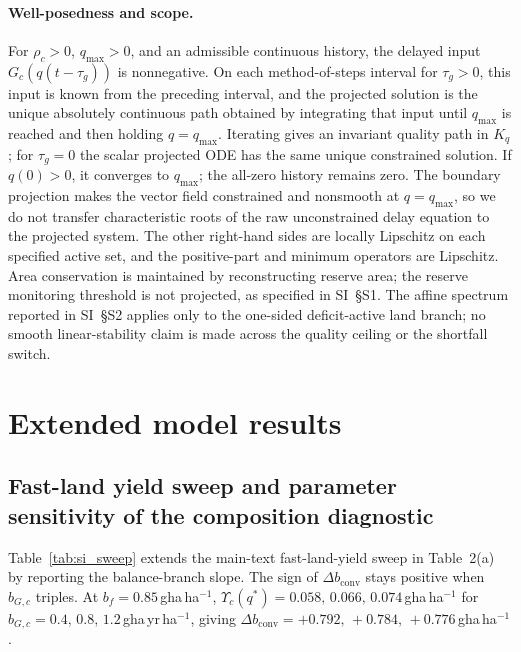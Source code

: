 \documentclass[11pt,a4paper]{article}
\newcommand{\dconv}{\Delta b_{\mathrm{conv}}}
\newcommand{\Ups}{\Upsilon_c}
\begin{document}
\paragraph{Well-posedness and scope.} For $\rho_c>0$, $q_{\max}>0$, and an admissible continuous history, the delayed input $G_c(q(t-\tau_g))$ is nonnegative. On each method-of-steps interval for $\tau_g>0$, this input is known from the preceding interval, and the projected solution is the unique absolutely continuous path obtained by integrating that input until $q_{\max}$ is reached and then holding $q=q_{\max}$. Iterating gives an invariant quality path in $K_q$; for $\tau_g=0$ the scalar projected ODE has the same unique constrained solution. If $q(0)>0$, it converges to $q_{\max}$; the all-zero history remains zero. The boundary projection makes the vector field constrained and nonsmooth at $q=q_{\max}$, so we do not transfer characteristic roots of the raw unconstrained delay equation to the projected system. The other right-hand sides are locally Lipschitz on each specified active set, and the positive-part and minimum operators are Lipschitz. Area conservation is maintained by reconstructing reserve area; the reserve monitoring threshold is not projected, as specified in SI~\S S1. The affine spectrum reported in SI~\S S2 applies only to the one-sided deficit-active land branch; no smooth linear-stability claim is made across the quality ceiling or the shortfall switch.

\section{Extended model results}\label{si:results}

\subsection{Fast-land yield sweep and parameter sensitivity of the composition diagnostic}\label{si:sweep}

Table~\ref{tab:si_sweep} extends the main-text fast-land-yield sweep in Table~2(a) by reporting the balance-branch slope. The sign of $\dconv$ stays positive when $b_{G,c}$ triples. At $b_f=0.85$\,gha\,ha$^{-1}$, $\Ups(q^*)=0.058,\,0.066,\,0.074$\,gha\,ha$^{-1}$ for $b_{G,c}=0.4,\,0.8,\,1.2$\,gha\,yr\,ha$^{-1}$, giving $\dconv=+0.792,\,+0.784,\,+0.776$\,gha\,ha$^{-1}$.
\end{document}
